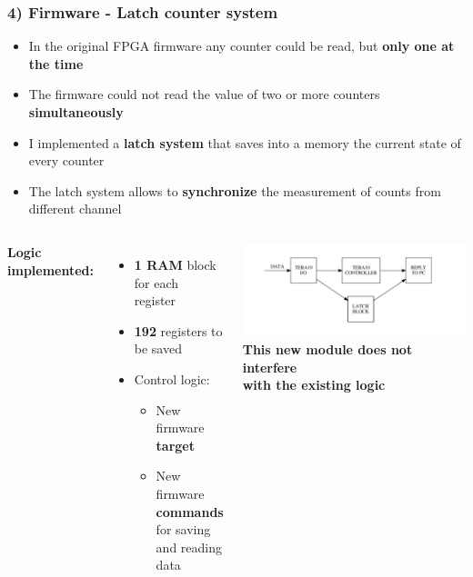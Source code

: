 \documentclass[aspectratio=169]{beamer}
\begin{document}
	\begin{frame}
		\frametitle{4) Firmware - Latch counter system}
		\begin{itemize}
			\item In the original FPGA firmware any counter could be read, but \textbf{only one at the time}
			\item The firmware could not read the value of two or more counters \textbf{simultaneously}
			\item I implemented a \textbf{latch system} that saves into a memory the current state of every counter
			\item The latch system allows to \textbf{synchronize} the measurement of counts from different channel
		\end{itemize}
		\begin{columns}
			{\color{blue} \textbf{Logic implemented:}}
			\begin{itemize}
				\item \textbf{1 RAM} block for each register
				\item \textbf{192} registers to be saved
				\item Control logic:
				\begin{itemize}
					\item New firmware \textbf{target}
					\item New firmware \textbf{commands} for saving and reading data
				\end{itemize}
			\end{itemize}
			\begin{center}
				\includegraphics[width=1.0 \textwidth]{IMG2/latch_counter}\\
				\textbf{This new module does not interfere\\with the existing logic}
			\end{center}
		\end{columns}
	\end{frame}
\end{document}
